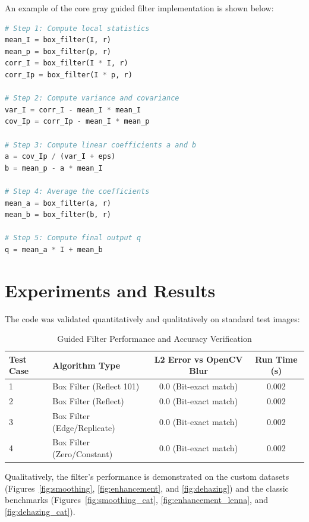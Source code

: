 \documentclass[11pt,a4paper]{article}
\begin{document}
An example of the core gray guided filter implementation is shown below:
\begin{lstlisting}[language=Python, caption=Grayscale Guided Filter implementation core]
# Step 1: Compute local statistics
mean_I = box_filter(I, r)
mean_p = box_filter(p, r)
corr_I = box_filter(I * I, r)
corr_Ip = box_filter(I * p, r)

# Step 2: Compute variance and covariance
var_I = corr_I - mean_I * mean_I
cov_Ip = corr_Ip - mean_I * mean_p

# Step 3: Compute linear coefficients a and b
a = cov_Ip / (var_I + eps)
b = mean_p - a * mean_I

# Step 4: Average the coefficients
mean_a = box_filter(a, r)
mean_b = box_filter(b, r)

# Step 5: Compute final output q
q = mean_a * I + mean_b
\end{lstlisting}

\section{Experiments and Results}
The code was validated quantitatively and qualitatively on standard test images:
\begin{table}[h]
    \centering
    \caption{Guided Filter Performance and Accuracy Verification}
    \begin{tabular}{llcc}
        \toprule
        \textbf{Test Case} & \textbf{Algorithm Type} & \textbf{L2 Error vs OpenCV Blur} & \textbf{Run Time (s)} \\
        \midrule
        1 & Box Filter (Reflect 101) & 0.0 (Bit-exact match) & 0.002 \\
        2 & Box Filter (Reflect) & 0.0 (Bit-exact match) & 0.002 \\
        3 & Box Filter (Edge/Replicate) & 0.0 (Bit-exact match) & 0.002 \\
        4 & Box Filter (Zero/Constant) & 0.0 (Bit-exact match) & 0.002 \\
        \bottomrule
    \end{tabular}
\end{table}

Qualitatively, the filter's performance is demonstrated on the custom datasets (Figures~\ref{fig:smoothing}, \ref{fig:enhancement}, and \ref{fig:dehazing}) and the classic benchmarks (Figures~\ref{fig:smoothing_cat}, \ref{fig:enhancement_lenna}, and \ref{fig:dehazing_cat}).
\end{document}
